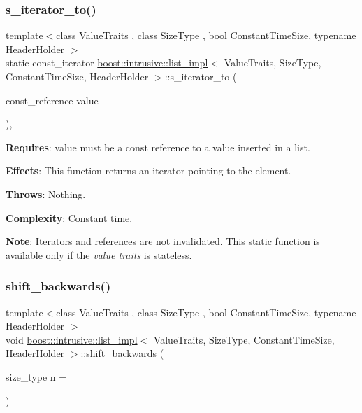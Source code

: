 \subsubsection{\texorpdfstring{s\+\_\+iterator\+\_\+to()}{s\_iterator\_to()}\hspace{0.1cm}{\footnotesize\ttfamily [2/2]}}
{\footnotesize\ttfamily template$<$class Value\+Traits , class Size\+Type , bool Constant\+Time\+Size, typename Header\+Holder $>$ \\
static const\+\_\+iterator \hyperlink{classboost_1_1intrusive_1_1list__impl}{boost\+::intrusive\+::list\+\_\+impl}$<$ Value\+Traits, Size\+Type, Constant\+Time\+Size, Header\+Holder $>$\+::s\+\_\+iterator\+\_\+to (\begin{DoxyParamCaption}\item[{const\+\_\+reference}]{value }\end{DoxyParamCaption})\hspace{0.3cm}{\ttfamily [inline]}, {\ttfamily [static]}}

{\bfseries Requires}\+: value must be a const reference to a value inserted in a list.

{\bfseries Effects}\+: This function returns an iterator pointing to the element.

{\bfseries Throws}\+: Nothing.

{\bfseries Complexity}\+: Constant time.

{\bfseries Note}\+: Iterators and references are not invalidated. This static function is available only if the {\itshape value traits} is stateless. \mbox{\label{classboost_1_1intrusive_1_1list__impl_a7b0d4d3142d0243ea881a0be968bdb14}} 
\subsubsection{\texorpdfstring{shift\+\_\+backwards()}{shift\_backwards()}}
{\footnotesize\ttfamily template$<$class Value\+Traits , class Size\+Type , bool Constant\+Time\+Size, typename Header\+Holder $>$ \\
void \hyperlink{classboost_1_1intrusive_1_1list__impl}{boost\+::intrusive\+::list\+\_\+impl}$<$ Value\+Traits, Size\+Type, Constant\+Time\+Size, Header\+Holder $>$\+::shift\+\_\+backwards (\begin{DoxyParamCaption}\item[{size\+\_\+type}]{n = {} }\end{DoxyParamCaption})\hspace{0.3cm}{\ttfamily [inline]}}

